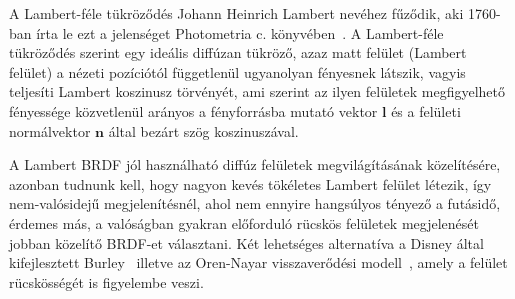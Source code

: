 A Lambert-féle tükröződés Johann Heinrich Lambert nevéhez fűződik, aki 1760-ban írta le ezt a jelenséget Photometria c. könyvében~\cite{klett1760ih}. A Lambert-féle tükröződés szerint egy ideális diffúzan tükröző, azaz matt felület (Lambert felület) a nézeti pozíciótól függetlenül ugyanolyan fényesnek látszik, vagyis teljesíti Lambert koszinusz törvényét, ami szerint az ilyen felületek megfigyelhető fényessége közvetlenül arányos a fényforrásba mutató vektor \(\mathbf{l}\) és a felületi normálvektor \(\mathbf{n}\) által bezárt szög koszinuszával.

A Lambert BRDF jól használható diffúz felületek megvilágításának közelítésére, azonban tudnunk kell, hogy nagyon kevés tökéletes Lambert felület létezik, így nem-valósidejű megjelenítésnél, ahol nem ennyire hangsúlyos tényező a futásidő, érdemes más, a valóságban gyakran előforduló rücskös felületek megjelenését jobban közelítő BRDF-et választani. Két lehetséges alternatíva a Disney által kifejlesztett Burley~\cite{burley2012physically} illetve az Oren-Nayar visszaverődési modell~\cite{oren1994generalization}, amely a felület rücskösségét is figyelembe veszi.

